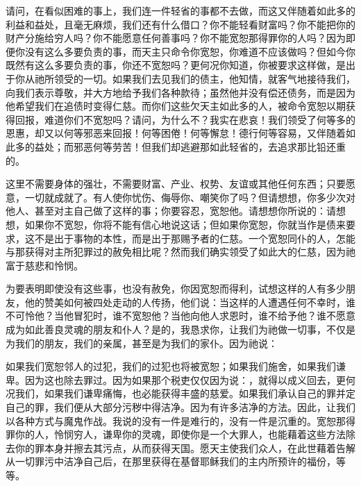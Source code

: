请问，在看似困难的事上，我们连一件轻省的事都不去做，而这又伴随着如此多的利益和益处，且毫无麻烦，我们还有什么借口？你不能轻看财富吗？你不能把你的财产分施给穷人吗？你不能愿意任何善事吗？你不能宽恕那得罪你的人吗？因为即便你没有这么多要负责的事，而天主只命令你宽恕，你难道不应该做吗？但如今你既然有这么多要负责的事，你还不宽恕吗？更何况你知道，你被要求这样做，是出于你从祂所领受的一切。如果我们去见我们的债主，他知情，就客气地接待我们，向我们表示尊敬，并大方地给予我们各种款待；虽然他并没有偿还债务，而是因为他希望我们在追债时变得仁慈。而你们这些欠天主如此多的人，被命令宽恕以期获得回报，难道你们不宽恕吗？请问，为什么不？我实在悲哀！我们领受了何等多的恩惠，却又以何等邪恶来回报！何等困倦！何等懈怠！德行何等容易，又伴随着如此多的益处；而邪恶何等劳苦！但我们却逃避那如此轻省的，去追求那比铅还重的。\par

这里不需要身体的强壮，不需要财富、产业、权势、友谊或其他任何东西；只要愿意，一切就成就了。有人使你忧伤、侮辱你、嘲笑你了吗？但请想想，你多少次对他人、甚至对主自己做了这样的事；你要容忍，宽恕他。请想想你所说的：请想想，如果你不宽恕，你将不能有信心地说这话；但如果你宽恕，你就当作是债来要求，这不是出于事物的本性，而是出于那赐予者的仁慈。一个宽恕同仆的人，怎能与那获得对主所犯罪过的赦免相比呢？然而我们确实领受了如此大的仁慈，因为祂富于慈悲和怜悯。\par

为要表明即使没有这些事，也没有赦免，你因宽恕而得利，试想这样的人有多少朋友，他的赞美如何被四处走动的人传扬，他们说：当这样的人遭遇任何不幸时，谁不可怜他？当他冒犯时，谁不宽恕他？当他向他人求恩时，谁不给予他？谁不愿意成为如此善良灵魂的朋友和仆人？是的，我恳求你，让我们为祂做一切事，不仅是为我们的朋友，我们的亲属，甚至是为我们的家仆。因为祂说：\par

如果我们宽恕邻人的过犯，我们的过犯也将被宽恕；如果我们施舍，如果我们谦卑。因为这也除去罪过。因为如果那个税吏仅仅因为说：，就得以成义回去，更何况我们，如果我们谦卑痛悔，也必能获得丰盛的慈爱。如果我们承认自己的罪并定自己的罪，我们便从大部分污秽中得洁净。因为有许多洁净的方法。因此，让我们以各种方式与魔鬼作战。我说的没有一件是难行的，没有一件是沉重的。宽恕那得罪你的人，怜悯穷人，谦卑你的灵魂，即使你是一个大罪人，也能藉着这些方法除去你的罪本身并擦去其污点，从而获得天国。愿天主使我们众人，在此世藉着告解从一切罪污中洁净自己后，在那里获得在基督耶稣我们的主内所预许的福份，等等。\par

